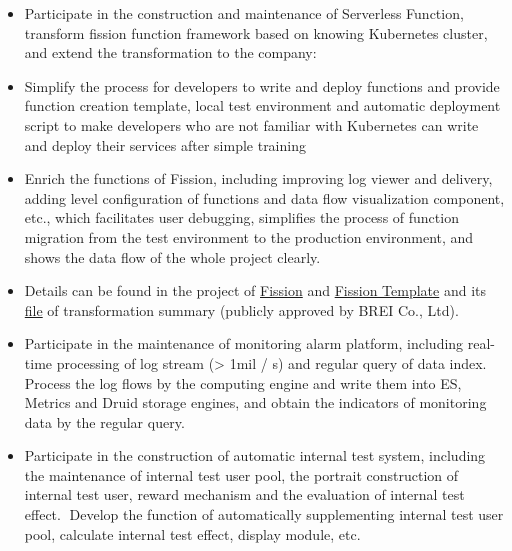 \documentclass{resume}
\begin{document}
\begin{itemize}[topsep = 0 pt, partopsep = 0pt]
  \item Participate in the construction and maintenance of Serverless Function, transform fission function framework based on knowing Kubernetes cluster, and extend the transformation to the company:
  \item Simplify the process for developers to write and deploy functions and provide function creation template, local test environment and automatic deployment script to make developers who are not familiar with Kubernetes can write and deploy their services after simple training
  \item Enrich the functions of Fission, including improving log viewer and delivery, adding level configuration of functions and data flow visualization component, etc., which facilitates user debugging, simplifies the process of function migration from the test environment to the production environment, and shows the data flow of the whole project clearly.
  \item Details can be found in the project of \href{https://github.com/jingtaozhang18/fission}{Fission} and \href{https://github.com/jingtaozhang18/fission-template}{Fission Template} and its \href{https://jingtao.fun/%E6%BA%90%E7%A0%81-Fission%E5%8A%9F%E8%83%BD%E6%8B%93%E5%B1%95/}{file} of transformation summary (publicly approved by BREI Co., Ltd).
\end{itemize}

\begin{itemize}[topsep = 0 pt, partopsep = 0pt]
  \item Participate in the maintenance of monitoring alarm platform, including real-time processing of log stream (> 1mil / s) and regular query of data index. Process the log flows by the computing engine and write them into ES, Metrics and Druid storage engines, and obtain the indicators of monitoring data by the regular query.
  \item Participate in the construction of automatic internal test system, including the maintenance of internal test user pool, the portrait construction of internal test user, reward mechanism and the evaluation of internal test effect. Develop the function of automatically supplementing internal test user pool, calculate internal test effect, display module, etc.
\end{itemize}
\end{document}
